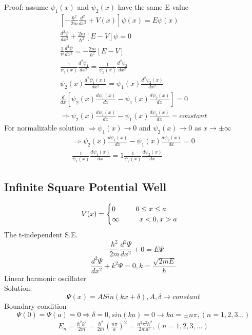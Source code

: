 \documentclass[12pt, a4paper]{article}
\newcommand{\tab}[1][1cm]{\hspace*{#1}}
\begin{document}
\begin{enumerate}
Proof: assume $\psi_1(x)$ and $\psi_2(x)$ have the same E value
\begin{align*}
\left[ -\frac{\hbar^2}{2m}\frac{d^2}{dx^2}+V(x) \right]\psi(x)=E\psi(x)\\
\frac{d^2\psi}{dx^2}+\frac{2m}{\hbar^2}[E-V]\psi=0\\
\frac{1}{\psi}\frac{d^2\psi}{dx^2}=-\frac{2m}{\hbar^2}[E-V]\\
\frac{1}{\psi_1(x)}\frac{d^2\psi_1}{dx^2}=\frac{1}{\psi_2(x)}\frac{d^2\psi_2}{dx^2}\\
\psi_2(x)\frac{d^2 \psi_1(x)}{dx^2}=\psi_1(x)\frac{d^2 \psi_2(x)}{dx^2}\\
\frac{d}{dx}\left[ \psi_2(x)\frac{d \psi_1(x)}{dx}-\psi_1(x)\frac{d \psi_2(x)}{dx}\right]=0\\
\Rightarrow\psi_2(x)\frac{d \psi_1(x)}{dx}-\psi_1(x)\frac{d \psi_2(x)}{dx}=constant
\end{align*}
For normalizable solution $\Rightarrow \psi_1(x)\rightarrow0$ and $\psi_2(x)\rightarrow 0$ as $x\rightarrow \pm\infty$
\begin{align*}
\Rightarrow \psi_2(x)\frac{d \psi_1(x)}{dx}-\psi_1(x)\frac{d \psi_2(x)}{dx}=0\\
\frac{1}{\psi_1(x)}\frac{d\psi_1(x)}{dx}=1\frac{1}{\psi_2(x)}\frac{d\psi_2(x)}{dx}
\end{align*}
\end{enumerate}



\subsection{Infinite Square Potential Well}
$$
V(x)=
\begin{cases}
0\tab 0\leq x\leq a\\
\infty \tab x<0, x>a
\end{cases}
$$
The t-independent S.E.$$-\frac{\hbar^2}{2m}\frac{d^2\Psi}{dx^2}+0=E\Psi$$
$$\frac{d^2\Psi}{dx^2}+k^2\Psi=0, k=\frac{\sqrt{2mE}}{\hbar}$$
Linear harmonic oscillater\\
Solution: $$\Psi(x) = ASin(kx+\delta), A,\delta\rightarrow constant$$
Boundary condition $$\Psi(0)=\Psi(a)=0\Rightarrow\delta=0,sin(ka)=0\rightarrow ka=\pm n\pi,(n=1,2,3...)$$
\begin{align*}
E_n=\frac{\hbar^2k^2}{2m}=\frac{\hbar^2}{2m}\left( \frac{n\pi}{a}\right)^2=\frac{n^2\pi^2\hbar^2}{2ma^2},(n=1,2,3,\hdots)
\end{align*}
\end{document}
